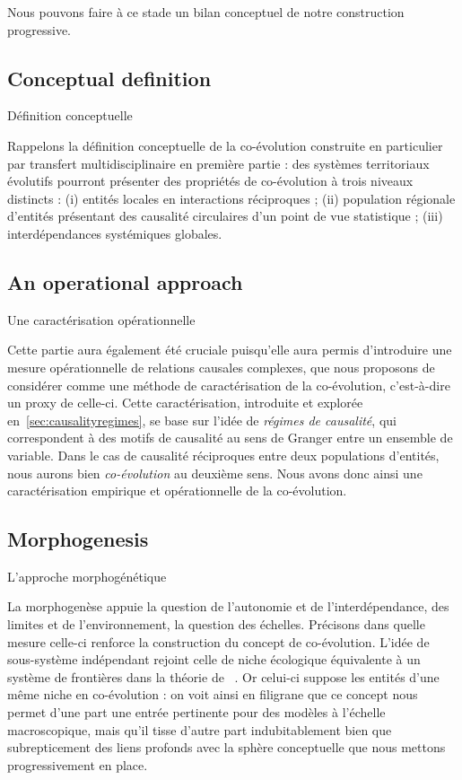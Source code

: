 Nous pouvons faire à ce stade un bilan conceptuel de notre construction progressive.


\subsection*{Conceptual definition}{Définition conceptuelle}


Rappelons la définition conceptuelle de la co-évolution construite en particulier par transfert multidisciplinaire en première partie : des systèmes territoriaux évolutifs pourront présenter des propriétés de co-évolution à trois niveaux distincts : (i) entités locales en interactions réciproques ; (ii) population régionale d'entités présentant des causalité circulaires d'un point de vue statistique ; (iii) interdépendances systémiques globales.


\subsection*{An operational approach}{Une caractérisation opérationnelle}


Cette partie aura également été cruciale puisqu'elle aura permis d'introduire une mesure opérationnelle de relations causales complexes, que nous proposons de considérer comme une méthode de caractérisation de la co-évolution, c'est-à-dire un proxy de celle-ci. Cette caractérisation, introduite et explorée en~\ref{sec:causalityregimes}, se base sur l'idée de \emph{régimes de causalité}, qui correspondent à des motifs de causalité au sens de Granger entre un ensemble de variable. Dans le cas de causalité réciproques entre deux populations d'entités, nous aurons bien \emph{co-évolution} au deuxième sens. Nous avons donc ainsi une caractérisation empirique et opérationnelle de la co-évolution.



\subsection*{Morphogenesis}{L'approche morphogénétique}


La morphogenèse appuie la question de l'autonomie et de l'interdépendance, des limites et de l'environnement, la question des échelles. Précisons dans quelle mesure celle-ci renforce la construction du concept de co-évolution. L'idée de sous-système indépendant rejoint celle de niche écologique équivalente à un système de frontières dans la théorie de ~\cite{holland2012signals}. Or celui-ci suppose les entités d'une même niche en co-évolution : on voit ainsi en filigrane que ce concept nous permet d'une part une entrée pertinente pour des modèles à l'échelle macroscopique, mais qu'il tisse d'autre part indubitablement bien que subrepticement des liens profonds avec la sphère conceptuelle que nous mettons progressivement en place.




